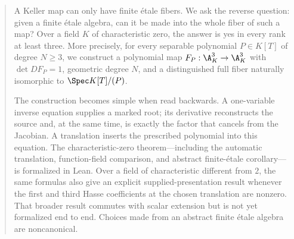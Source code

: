 \begin{abstract}
A Keller map can only have finite \'etale fibers.  We ask the reverse
question: given a finite \'etale algebra, can it be made into the whole
fiber of such a map?  Over a field \(K\) of characteristic zero, the answer
is yes in every rank at least three.  More precisely, for every separable
polynomial \(P\in K[T]\) of degree \(N\geq3\), we construct a polynomial map
\(F_P:\A^3_K\to\A^3_K\) with \(\det DF_P=1\), geometric degree \(N\), and a
distinguished full fiber naturally isomorphic to \(\Spec K[T]/(P)\).

The construction becomes simple when read backwards.  A one-variable
inverse equation supplies a marked root; its derivative reconstructs the
source and, at the same time, is exactly the factor that cancels from the
Jacobian.  A translation inserts the prescribed polynomial into this
equation.  The characteristic-zero theorem---including the automatic
translation, function-field comparison, and abstract finite-\'etale
corollary---is formalized in Lean.  Over a field of characteristic different
from \(2\), the same formulas also give an explicit supplied-presentation
result whenever the first and third Hasse coefficients at the chosen
translation are nonzero.  That broader result commutes with scalar extension
but is not yet formalized end to end.  Choices made from an abstract finite
\'etale algebra are noncanonical.
\end{abstract}
